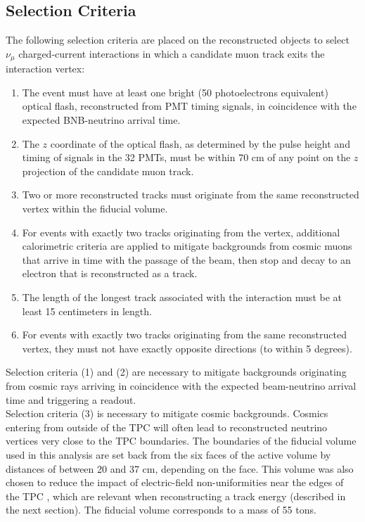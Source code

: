 \subsection{Selection Criteria}\label{kaon_event_selection_section}
The following selection criteria are placed on the reconstructed objects to select $\nu_\mu$ charged-current interactions in which a candidate muon track exits the interaction vertex:

\begin{enumerate}
\item The event must have at least one bright (50 photoelectrons equivalent) optical flash, reconstructed from PMT timing signals, in coincidence with the expected BNB-neutrino arrival time. %
\item The $z$ coordinate of the optical flash, as determined by the pulse height and timing of signals in the 32 PMTs, must be within 70 cm of any point on the $z$ projection of the candidate muon track. %
\item Two or more reconstructed tracks must originate from the same reconstructed vertex within the fiducial volume. %
\item For events with exactly two tracks originating from the vertex, additional calorimetric criteria are applied to mitigate backgrounds from cosmic muons that arrive in time with the passage of the beam, then stop and decay to an electron that is reconstructed as a track. %
\item The length of the longest track associated with the interaction must be at least 15 centimeters in length.
\item For events with exactly two tracks originating from the same reconstructed vertex, they must not have exactly opposite directions (to within 5 degrees).
\end{enumerate}

Selection criteria (1) and (2) are necessary to mitigate backgrounds originating from cosmic rays arriving in coincidence with the expected beam-neutrino arrival time and triggering a readout. \\

Selection criteria (3) is necessary to mitigate cosmic backgrounds. Cosmics entering from outside of the TPC will often lead to reconstructed neutrino vertices very close to the TPC boundaries. The boundaries of the fiducial volume used in this analysis are set back from the six faces of the active volume by distances of between 20 and 37 cm, depending on the face. This volume was also chosen to reduce the impact of electric-field non-uniformities near the edges of the TPC \cite{SCE_publicnote}, which are relevant when reconstructing a track energy (described in the next section). The fiducial volume corresponds to a mass of 55 tons.\\

